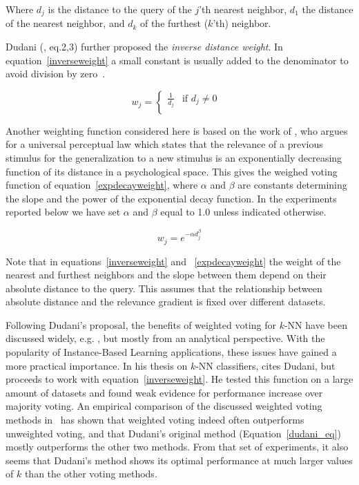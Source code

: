 \documentclass{report}
\begin{document}
Where $d_{j}$ is the distance to the query of the $j$'th nearest
neighbor, $d_{1}$ the distance of the nearest neighbor, and $d_{k}$ of
the furthest ($k$'th) neighbor.

Dudani (, eq.2,3) further proposed the {\em inverse
distance weight}. In equation~\ref{inverseweight} a small constant is
usually added to the denominator to avoid division by
zero~\cite{Wettschereck94}.

\begin{equation}
\label{inverseweight}
w_{j}= \left \{ \begin{array}{ll}  
                        \frac{1}{d_{j}} & \mbox{if $d_{j} \not= 0$ } \\ 
                    \end{array} 
          \right. 
\end{equation}

Another weighting function considered here is based on the work of
, who argues for a universal perceptual law
which states that the relevance of a previous stimulus for the
generalization to a new stimulus is an exponentially decreasing
function of its distance in a psychological space. This gives the
weighed voting function of equation~\ref{expdecayweight}, where
$\alpha$ and $\beta$ are constants determining the slope and the power
of the exponential decay function. In the experiments reported below
we have set $\alpha$ and $\beta$ equal to 1.0 unless indicated
otherwise.

\begin{equation}
\label{expdecayweight}
w_{j}= e^{-\alpha d_{j}^\beta}
\end{equation}

Note that in equations~\ref{inverseweight} and ~\ref{expdecayweight}
the weight of the nearest and furthest neighbors and the slope between
them depend on their absolute distance to the query. This assumes that
the relationship between absolute distance and the relevance gradient
is fixed over different datasets.

Following Dudani's proposal, the benefits of weighted voting for
$k$-NN have been discussed widely,
e.g. \cite{Bailey+78,Morin+81,MacLeod+87}, but mostly from an
analytical perspective. With the popularity of Instance-Based Learning
applications, these issues have gained a more practical importance. In
his thesis on $k$-NN classifiers,  cites
Dudani, but proceeds to work with equation~\ref{inverseweight}. He
tested this function on a large amount of datasets and found weak
evidence for performance increase over majority voting. An empirical
comparison of the discussed weighted voting methods in~\cite{Zavrel97}
has shown that weighted voting indeed often outperforms unweighted
voting, and that Dudani's original method (Equation~\ref{dudani_eq})
mostly outperforms the other two methods. From that set of
experiments, it also seems that Dudani's method shows its optimal
performance at much larger values of $k$ than the other voting
methods.
\end{document}

